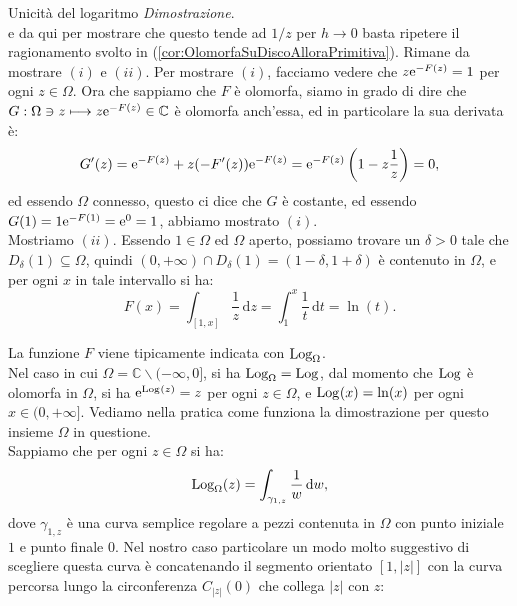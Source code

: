 \documentclass[11pt]{book}
\makeatletter
\theoremstyle{Definizione}
\theoremstyle{TeoremaProposizioneLemmaCorollarioCongettura}
\theoremstyle{OsservazioneNotaEsempio}
\renewenvironment{proof}[1][\proofname]{\par
  \normalfont \topsep6\p@\@plus6\p@\relax
  \trivlist
  \item[\hskip\labelsep
        \itshape
    #1\@addpunct{.}]\ignorespaces
}{%
  \endtrivlist\@endpefalse
}
\renewenvironment{proof}{\textsl{Dimostrazione}.}{}
\newcommand{\C}{\mathbb{C}}
\newcommand{\Disc}[3][]{D^{#1}_{{#2}}({#3})}
\newcommand{\tolto}{\smallsetminus}
\newcommand{\e}{\textup{e}}
\renewcommand{\d}{\mathrm{d}}
\newcommand{\dz}{\,\d z}
\newcommand{\dt}{\,\d t}
\newcommand{\dw}{\,\d w}
\newcommand{\Log}[1][]{\textup{Log}_{#1}}
\makeatother
\begin{document}
\begin{boxteo}{Unicità del logaritmo}
\begin{proof}
$$$$
e da qui per mostrare che questo tende ad $1/z$ per $h \to 0$ basta ripetere il ragionamento svolto in (\ref{cor:OlomorfaSuDiscoAlloraPrimitiva}). Rimane da mostrare $(i)$ e $(ii)$. Per mostrare $(i)$, facciamo vedere che $z\e^{-F(z)} = 1$ per ogni $z\in \Omega$. Ora che sappiamo che $F$ è olomorfa, siamo in grado di dire che $G:\Omega \ni z \longmapsto z \e^{-F(z)} \in \C$ è olomorfa anch'essa, ed in particolare la sua derivata è:
$$
G'(z) = \e^{-F(z)}+z(-F'(z))\e^{-F(z)} = \e^{-F(z)}\left(1-z\frac{1}{z}\right) = 0,
$$
ed essendo $\Omega$ connesso, questo ci dice che $G$ è costante, ed essendo $G(1) = 1\e^{-F(1)} = \e^{0} = 1$, abbiamo mostrato $(i)$.\\
Mostriamo $(ii)$. Essendo $1\in \Omega$ ed $\Omega$ aperto, possiamo trovare un $\delta > 0$ tale che $\Disc{\delta}{1} \subseteq \Omega$, quindi $(0,+\infty) \cap \Disc{\delta}{1} = (1-\delta,1+\delta)$ è contenuto in $\Omega$, e per ogni $x$ in tale intervallo si ha:
$$
F(x) = \int_{[1,x]} \frac{1}{z}\dz = \int_1^x \frac{1}{t}\dt = \ln(t).
$$
\end{proof}
\end{boxteo}
\noindent
La funzione $F$ viene tipicamente indicata con $\Log[\Omega]$.\\
Nel caso in cui $\Omega = \C \tolto (-\infty,0]$, si ha $\Log[\Omega] = \Log$, dal momento che $\Log$ è olomorfa in $\Omega$, si ha $\e^{\Log(z)} = z$ per ogni $z\in \Omega$, e $\Log(x) =\ln(x)$ per ogni $x\in (0,+\infty]$. Vediamo nella pratica come funziona la dimostrazione per questo insieme $\Omega$ in questione.\\
Sappiamo che per ogni $z\in \Omega$ si ha:
$$
\Log[\Omega](z) = \int_{\gamma_{1,z}} \frac{1}{w}\dw,
$$
dove $\gamma_{1,z}$ è una curva semplice regolare a pezzi contenuta in $\Omega$ con punto iniziale $1$ e punto finale $0$. Nel nostro caso particolare un modo molto suggestivo di scegliere questa curva è concatenando il segmento orientato $[1,|z|]$ con la curva percorsa lungo la circonferenza $C_{|z|}(0)$ che collega $|z|$ con $z$:
\end{document}
